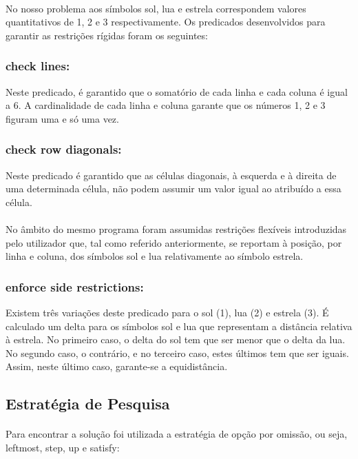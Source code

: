 \documentclass[a4paper]{article}
\begin{document}
\paragraph{}
No nosso problema aos símbolos sol, lua e estrela correspondem valores quantitativos de 1, 2 e 3 respectivamente. Os predicados desenvolvidos para garantir as restrições rígidas foram os seguintes:

\subsubsection{check lines:}
Neste predicado, é garantido que o somatório de cada linha e cada coluna é igual a 6. A cardinalidade de cada linha e coluna garante que os números 1, 2 e 3 figuram uma e só uma vez.

\subsubsection{check row diagonals:}
Neste predicado é garantido que as células diagonais, à esquerda e à direita de uma determinada célula, não podem assumir um valor igual ao atribuído a essa célula.

\paragraph{}
No âmbito do mesmo programa foram assumidas restrições flexíveis introduzidas pelo utilizador que, tal como referido anteriormente, se reportam à posição, por linha e coluna, dos símbolos sol e lua relativamente ao símbolo estrela. 

\subsubsection{enforce side restrictions:}
Existem três variações deste predicado para o sol (1), lua (2) e estrela (3). É calculado um delta para os símbolos sol e lua que representam a distância relativa à estrela. No primeiro caso, o delta do sol tem que ser menor que o delta da lua. No segundo caso, o contrário, e no terceiro caso, estes últimos tem que ser iguais. Assim, neste último caso, garante-se a equidistância.

\subsection{Estratégia de Pesquisa} 

\paragraph{}
Para encontrar a solução foi utilizada a estratégia de opção por omissão, ou seja, leftmost, step, up e satisfy:
\end{document}
